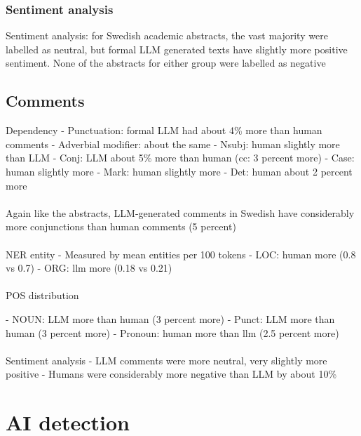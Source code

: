 \documentclass[thesis]{cluu}
\begin{document}
\paragraph{}
\subsubsection{Sentiment analysis}
Sentiment analysis: for Swedish academic abstracts, the vast majority were labelled as neutral, but formal LLM generated texts have slightly more positive sentiment. None of the abstracts for either group were labelled as negative

\subsection{Comments}

Dependency
	- Punctuation: formal LLM had about 4\% more than human comments
	- Adverbial modifier: about the same
	- Nsubj: human slightly more than LLM
	- Conj: LLM about 5\% more than human (cc: 3 percent more)
	- Case: human slightly more
	- Mark: human slightly more
	- Det: human about 2 percent more
\paragraph{}
Again like the abstracts, LLM-generated comments in Swedish have considerably more conjunctions than human comments (5 percent)
\paragraph{}
NER entity
	- Measured by mean entities per 100 tokens
	- LOC: human more (0.8 vs 0.7)
	- ORG: llm more (0.18 vs 0.21)
\paragraph{}
POS distribution

	- NOUN: LLM more than human (3 percent more)
	- Punct: LLM more than human (3 percent more)
	- Pronoun: human more than llm (2.5 percent more)
\paragraph{}
Sentiment analysis
	- LLM comments were more neutral, very slightly more positive
	- Humans were considerably more negative than LLM by about 10\%


\section{AI detection}
\end{document}
